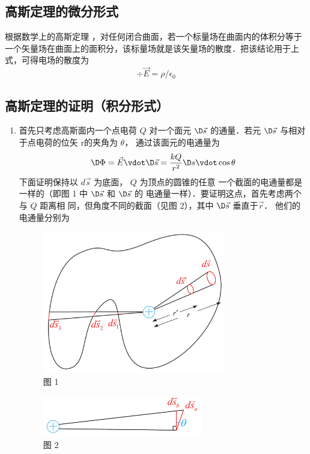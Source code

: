 \subsection{高斯定理的微分形式}

根据数学上的高斯定理%
，对任何闭合曲面，若一个标量场在曲面内的体积分等于一个矢量场在曲面上的面积分，该标量场就是该矢量场的散度．把该结论用于上式，可得电场的散度为
\begin{equation}
\div \vec E = \rho / \epsilon_0
\end{equation} 


\subsection{高斯定理的证明（积分形式）}
\begin{enumerate}
\item 首先只考虑高斯面内一个点电荷 $Q$ 对一个面元 $\D\vec s$ 的通量．若元 $\D\vec s$ 与相对于点电荷的位矢 \vec r的夹角为 $\theta $， 通过该面元的电通量为
\begin{equation}
\D \Phi  = \vec E \vdot \D \vec s = \frac{{kQ}}{{{r^2}}}\D s \vdot \cos \theta 
\end{equation} 
下面证明保持以 $d\vec s$ 为底面， $Q$ 为顶点的圆锥的任意
一个截面的电通量都是一样的（即图 1 中 $\D\vec s$ 和 $\D\vec s$ 的
电通量一样）．要证明这点，首先考虑两个与 $Q$ 距离相
同，但角度不同的截面（见图 2），其中 $\D\vec s$ 垂直于$\vec r$． 他们的电通量分别为
\begin{figure}[ht]
\centering
\includegraphics[width=8cm]{./figures/EGauss1.pdf}
\caption{图 1}
\end{figure}
\begin{figure}[ht]
\centering
\includegraphics[width=7cm]{./figures/EGauss2.pdf}
\caption{图 2}
\end{figure}


\end{enumerate}
